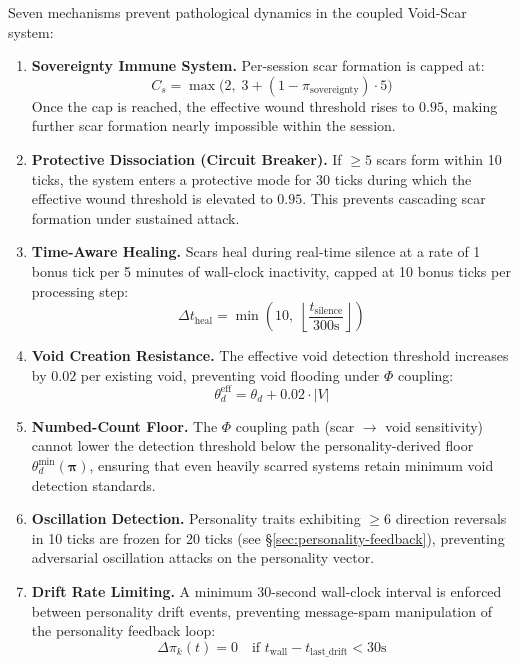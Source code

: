 \documentclass[11pt]{article}
\begin{document}
Seven mechanisms prevent pathological dynamics in the coupled Void-Scar system:

\begin{enumerate}[leftmargin=*]
\item \textbf{Sovereignty Immune System.} Per-session scar formation is capped at:
\begin{equation}
C_s = \max\bigl(2,\; 3 + (1 - \pi_{\text{sovereignty}}) \cdot 5\bigr)
\end{equation}
Once the cap is reached, the effective wound threshold rises to $0.95$, making further scar formation nearly impossible within the session.

\item \textbf{Protective Dissociation (Circuit Breaker).} If $\geq 5$ scars form within 10 ticks, the system enters a protective mode for 30 ticks during which the effective wound threshold is elevated to $0.95$. This prevents cascading scar formation under sustained attack.

\item \textbf{Time-Aware Healing.} Scars heal during real-time silence at a rate of 1 bonus tick per 5 minutes of wall-clock inactivity, capped at 10 bonus ticks per processing step:
\begin{equation}
\Delta t_{\text{heal}} = \min\!\left(10,\; \left\lfloor \frac{t_{\text{silence}}}{300\text{s}} \right\rfloor\right)
\end{equation}

\item \textbf{Void Creation Resistance.} The effective void detection threshold increases by $0.02$ per existing void, preventing void flooding under $\Phi$ coupling:
\begin{equation}
\theta_d^{\text{eff}} = \theta_d + 0.02 \cdot |V|
\end{equation}

\item \textbf{Numbed-Count Floor.} The $\Phi$ coupling path (scar $\to$ void sensitivity) cannot lower the detection threshold below the personality-derived floor $\theta_d^{\min}(\boldsymbol{\pi})$, ensuring that even heavily scarred systems retain minimum void detection standards.

\item \textbf{Oscillation Detection.} Personality traits exhibiting $\geq 6$ direction reversals in 10 ticks are frozen for 20 ticks (see \S\ref{sec:personality-feedback}), preventing adversarial oscillation attacks on the personality vector.

\item \textbf{Drift Rate Limiting.} A minimum 30-second wall-clock interval is enforced between personality drift events, preventing message-spam manipulation of the personality feedback loop:
\begin{equation}
\Delta\pi_k(t) = 0 \quad \text{if } t_{\text{wall}} - t_{\text{last\_drift}} < 30\text{s}
\end{equation}
\end{enumerate}
\end{document}
